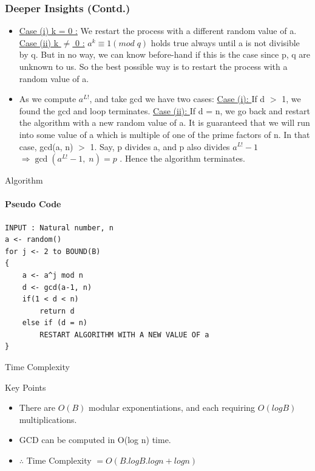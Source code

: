 \documentclass{beamer}
\begin{document}
\begin{frame}
\frametitle{Deeper Insights (Contd.)}
\begin{itemize}
    \item \underline{Case (i) k = 0 :} We restart the process with a different random value of a.
    \break
    \underline{Case (ii) k $\neq$ 0 :} $a^{k}\equiv 1\left( mod \;q\right) $ holds true always until a is not divisible by q. But in no way, we can know before-hand if this is the case since p, q are unknown to us. So the best possible way is to restart the process with a random value of a.
    \item As we compute $a^{L!}$, and take gcd we have two cases:\break
    \underline{Case (i): } If d $>$ 1, we found the gcd and loop terminates.\break
    \underline{Case (ii): } If d = n, we go back and restart the algorithm with a new random value of a. It is guaranteed that we will run into some value of a which is multiple of one of the prime factors of n. In that case, gcd(a, n) $>$ 1. Say, p divides a, and p also divides $a^{L!}-1$
    $\Rightarrow \gcd \left( a^{L!}-1, \;n\right) = p$ . Hence the algorithm terminates.
    
\end{itemize}
\end{frame}


\begin{frame}[fragile]{Algorithm}
\framesubtitle{Pseudo Code}
\begin{verbatim}
INPUT : Natural number, n
a <- random()
for j <- 2 to BOUND(B)
{
    a <- a^j mod n
    d <- gcd(a-1, n)
    if(1 < d < n)
        return d
    else if (d = n)
        RESTART ALGORITHM WITH A NEW VALUE OF a
}
\end{verbatim}
\end{frame}


\begin{frame}{Time Complexity}
    \begin{block}{Key Points}
        \begin{itemize}
            \item There are $O\left( B\right)$ modular exponentiations, and each requiring $O\left(log B\right)$ multiplications.
            \item GCD can be computed in O(log n) time.
            \item $ \therefore$ Time Complexity $= O(B. log B. log n + log n) $
        \end{itemize}
    \end{block}
    
\end{frame}
\end{document}
